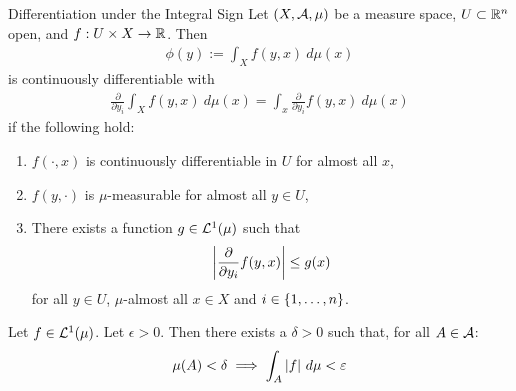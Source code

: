 \begin{importanttheorem}{Differentiation under the Integral Sign}{}
	Let $(X, \mathcal{A}, \mu)$ be a measure space, $U \subset \mathbb{R}^n$ open, and $f : U \times X \to \mathbb{R}$.
	Then
	\begin{align*}
		\phi(y) := \int_X f(y,x) ~d\mu(x)
	\end{align*}
	is continuously differentiable with
	\begin{align*}
		\frac{\partial}{\partial y_i} \int_X f(y,x) ~d\mu(x) = \int_x \frac{\partial}{\partial y_i} f(y,x) ~d\mu(x)
	\end{align*}
	if the following hold:
	\begin{enumerate}
		\item $f(\cdot,x)$ is continuously differentiable in $U$ for almost all $x$,
		\item $f(y,\cdot)$ is $\mu$-measurable for almost all $y \in U$,
		\item There exists a function $g \in \mathcal{L}^1(\mu)$ such that
		\begin{align*}
			\abs{\frac{\partial}{\partial y_i} f(y,x)} \leq g(x)
		\end{align*}
		for all $y \in U$, $\mu$-almost all $x \in X$ and $i \in \qty{1,\hdots,n}$.
	\end{enumerate}
\end{importanttheorem}
\begin{theorem}
	Let $f \in \mathcal{L}^1(\mu)$. Let $\epsilon > 0$. Then there exists a $\delta > 0$ such that, for all $A \in \mathcal{A}$:
	\begin{align*}
		\mu(A) < \delta \implies \int_A \abs{f} ~d\mu < \varepsilon
	\end{align*}
\end{theorem}
\clearpage

